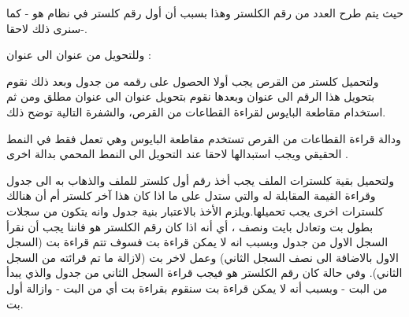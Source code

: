 \documentclass[document.tex]{subfiles}
\begin{document}
حيث يتم طرح العدد  من رقم الكلستر وهذا بسبب أن أول رقم كلستر في نظام  هو  - كما سنرى ذلك لاحقا-.

وللتحويل من عنوان  الى عنوان  :

\begin{english}
\lstset{numberstyle=\tiny,numbersep=5pt,tabsize=2,extendedchars=true,breaklines=true,frame=b,showspaces=false, showtabs=false,xleftmargin=10pt,framexleftmargin=10pt,framexrightmargin=5pt,framexbottommargin=4pt,showstringspaces=false,language=[x86masm]Assembler}


\end{english}

ولتحميل كلستر من القرص يجب أولا الحصول على رقمه من جدول  وبعد ذلك نقوم بتحويل هذا الرقم الى عنوان  وبعدها نقوم بتحويل عنوان  الى عنوان مطلق  ومن ثم استخدام مقاطعة البايوس  لقراءة القطاعات من القرص، والشفرة التالية توضح ذلك.

\begin{english}
\lstset{numberstyle=\tiny,numbersep=5pt,tabsize=2,extendedchars=true,breaklines=true,frame=b,showspaces=false, showtabs=false,xleftmargin=10pt,framexleftmargin=10pt,framexrightmargin=5pt,framexbottommargin=4pt,showstringspaces=false,language=[x86masm]Assembler}


\end{english}

ودالة قراءة القطاعات من القرص تستخدم مقاطعة البايوس  وهي تعمل فقط في النمط الحقيقي ويجب استبدالها لاحقا عند التحويل الى النمط المحمي بدالة اخرى .

\begin{english}
\lstset{numberstyle=\tiny,numbersep=5pt,tabsize=2,extendedchars=true,breaklines=true,frame=b,showspaces=false, showtabs=false,xleftmargin=10pt,framexleftmargin=10pt,framexrightmargin=5pt,framexbottommargin=4pt,showstringspaces=false,language=[x86masm]Assembler}


\end{english}

ولتحميل بقية كلسترات الملف يجب أخذ رقم أول كلستر للملف والذهاب به الى جدول  وقراءة القيمة المقابلة له والتي ستدل على ما اذا كان هذا آخر كلستر أم أن هنالك كلسترات اخرى يجب تحميلها.ويلزم الأخذ بالاعتبار بنية جدول  وانه يتكون من سجلات بطول  بت وتعادل بايت ونصف ، أي أنه اذا كان رقم الكلستر هو  فاننا يجب أن نقرأ السجل الاول من جدول  وبسبب انه لا يمكن قراءة  بت فسوف تتم قراءة  بت (السجل الاول بالاضافة الى نصف السجل الثاني) وعمل  لاخر  بت (لازالة ما تم قرائته من السجل الثاني). وفي حالة كان رقم الكلستر هو   فيجب قراءة السجل الثاني من جدول  والذي يبدأ من البت - وبسبب أنه لا يمكن قراءة  بت سنقوم بقراءة  بت أي من البت - وازالة أول  بت.\\
\end{document}
